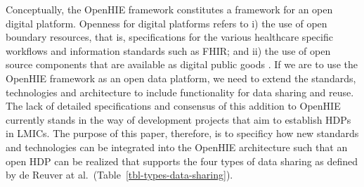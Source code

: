 \documentclass[
  authoryear]{elsarticle}
\begin{document}
Conceptually, the OpenHIE framework constitutes a framework for an open
digital platform. Openness for digital platforms refers to i) the use of
open boundary resources, that is, specifications for the various
healthcare specific workflows and information standards such as FHIR;
and ii) the use of open source components that are available as digital
public goods \citep{digitalpublicgoods}. If we are to use the OpenHIE
framework as an open data platform, we need to extend the standards,
technologies and architecture to include functionality for data sharing
and reuse. The lack of detailed specifications and consensus of this
addition to OpenHIE currently stands in the way of development projects
that aim to establish HDPs in LMICs. The purpose of this paper,
therefore, is to specificy how new standards and technologies can be
integrated into the OpenHIE architecture such that an open HDP can be
realized that supports the four types of data sharing as defined by de
Reuver at al.~(Table~\ref{tbl-types-data-sharing}).
\end{document}
